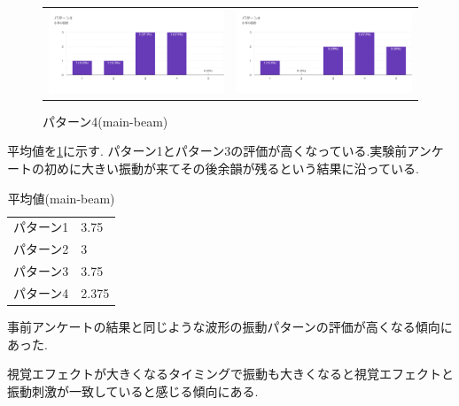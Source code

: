 \begin{figure}[h]
\begin{tabular}{cc}
      \begin{minipage}[t]{0.45\hsize}
        \centering
        \includegraphics[keepaspectratio, scale=0.5]{fig/inceneration3.png}
        \caption{パターン3(main-beam)}
        \label{fill}
      \end{minipage} &
      \begin{minipage}[t]{0.45\hsize}
        \centering
        \includegraphics[keepaspectratio, scale=0.5]{fig/inceneration4.png}
        \caption{パターン4(main-beam)}
        \label{transform}
      \end{minipage} 
    \end{tabular}
  \end{figure}

平均値を\ref{tab;mainAve}に示す.
パターン1とパターン3の評価が高くなっている.実験前アンケートの初めに大きい振動が来てその後余韻が残るという結果に沿っている.

  \begin{table}[H]
    \caption{\label{tab;mainAve}平均値(main-beam)}
    \centering
    \begin{tabular}{l|l}
    \hline
    \hline
    パターン1 & 3.75\\
    パターン2 & 3\\
    パターン3 & 3.75\\
    パターン4 & 2.375\\
    \hline
    \end{tabular}
\end{table}

事前アンケートの結果と同じような波形の振動パターンの評価が高くなる傾向にあった.

視覚エフェクトが大きくなるタイミングで振動も大きくなると視覚エフェクトと振動刺激が一致していると感じる傾向にある.


